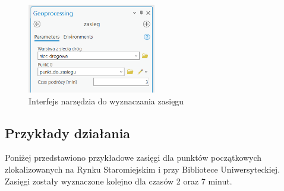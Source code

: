 \documentclass{article}
\begin{document}
\begin{figure}[H]
    \centering
    \includegraphics[width=0.5\textwidth]{img/narzedzie-interfejs-zasieg.png}
    \caption{ Interfejs narzędzia do wyznaczania zasięgu}
\end{figure}

\newpage
\subsection{Przykłady działania}
Poniżej przedstawiono przykładowe zasięgi dla punktów początkowych zlokalizowanych na Rynku Staromiejskim i przy Bibliotece Uniwersyteckiej. Zasięgi zostały wyznaczone kolejno dla czasów 2 oraz 7 minut.
\end{document}
